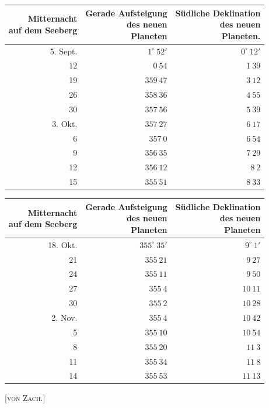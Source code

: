 \begin{center}
\begingroup\fontsize{9}{11}\selectfont\setlength{\tabcolsep}{3pt}\renewcommand{\arraystretch}{1.12}
\begin{tabular}{r|r|r}
\shortstack{Mitternacht\\auf dem Seeberg} & \shortstack{Gerade Aufsteigung\\des neuen\\Planeten} & \shortstack{Südliche Deklination\\des neuen\\Planeten.} \\ \hline
5. Sept. & $1^\circ\ 52'$ & $0^\circ\ 12'$ \\
12 & $0\ 54$ & $1\ 39$ \\
19 & $359\ 47$ & $3\ 12$ \\
26 & $358\ 36$ & $4\ 55$ \\
30 & $357\ 56$ & $5\ 39$ \\
3. Okt. & $357\ 27$ & $6\ 17$ \\
6 & $357\ 0$ & $6\ 54$ \\
9 & $356\ 35$ & $7\ 29$ \\
12 & $356\ 12$ & $8\ 2$ \\
15 & $355\ 51$ & $8\ 33$ \\
\end{tabular}\endgroup
\end{center}
\begin{center}
\begingroup\fontsize{9}{11}\selectfont\setlength{\tabcolsep}{3pt}\renewcommand{\arraystretch}{1.12}
\begin{tabular}{r|r|r}
\shortstack{Mitternacht\\auf dem Seeberg} & \shortstack{Gerade Aufsteigung\\des neuen\\Planeten} & \shortstack{Südliche Deklination\\des neuen\\Planeten} \\ \hline
18. Okt. & $355^\circ\ 35'$ & $9^\circ\ 1'$ \\
21 & $355\ 21$ & $9\ 27$ \\
24 & $355\ 11$ & $9\ 50$ \\
27 & $355\ 4$ & $10\ 11$ \\
30 & $355\ 2$ & $10\ 28$ \\
2. Nov. & $355\ 4$ & $10\ 42$ \\
5 & $355\ 10$ & $10\ 54$ \\
8 & $355\ 20$ & $11\ 3$ \\
11 & $355\ 34$ & $11\ 8$ \\
14 & $355\ 53$ & $11\ 13$ \\
\end{tabular}\endgroup
\end{center}

\hfill[\textsc{von Zach.}]
